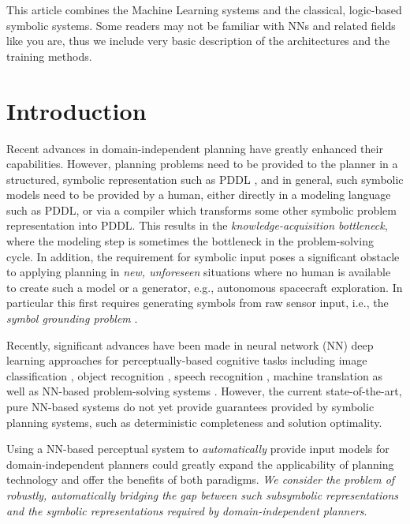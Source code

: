 \documentclass[11pt]{article}
\begin{document}
This article
combines the Machine Learning systems and the classical, logic-based symbolic systems.
Some readers may not be familiar with NNs and related fields like you are, thus
we include very basic description of the architectures and the training methods.

\section{Introduction}

\label{sec:introduction}

Recent advances in domain-independent planning have greatly enhanced their capabilities.
However, planning problems need to be provided to the planner in a structured, symbolic representation such as PDDL \cite{McDermott00}, and in general, such symbolic models need to be provided by a human, either directly in a modeling language such as PDDL, or via a compiler which transforms some other symbolic problem representation into PDDL.
This results in the {\it knowledge-acquisition bottleneck}, where the modeling step is sometimes the bottleneck in the problem-solving cycle.
In addition, the requirement for symbolic input poses a significant obstacle to applying planning in {\it new, unforeseen} situations where no human is available to create such a model or a generator, e.g., autonomous spacecraft exploration.
In particular this first requires generating symbols from raw sensor input, i.e., the {\it symbol grounding problem} \cite{Steels2008}.

Recently,  significant advances have been made in neural network (NN) deep learning approaches for perceptually-based cognitive tasks including image classification \cite{deng2009imagenet}, object recognition \cite{ren2015faster}, speech recognition \cite{deng2013new}, machine translation
as well as  NN-based problem-solving systems \cite{dqn,neuraltm}.
However, the current state-of-the-art, pure NN-based systems do not yet provide guarantees provided by symbolic planning systems, such as deterministic completeness and solution optimality.


Using a NN-based perceptual system to 
{\it automatically} provide input models for domain-independent planners could greatly expand the applicability of planning technology and offer the benefits of both paradigms.
\emph{We consider the problem of robustly,  automatically bridging the gap between such subsymbolic representations and the symbolic representations required by domain-independent planners}.
\end{document}
